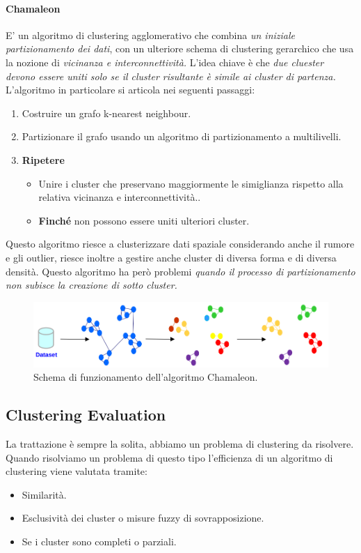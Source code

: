 \paragraph{Chamaleon} E' un algoritmo di clustering agglomerativo che combina \textit{un iniziale partizionamento dei dati}, con un ulteriore schema di clustering gerarchico che usa la nozione di \textit{vicinanza e interconnettività.} L'idea chiave è che \textit{due cluester devono essere uniti solo se il cluster risultante è simile ai cluster di partenza.}
L'algoritmo in particolare si articola nei seguenti passaggi:
\begin{enumerate}
	\item Costruire un grafo k-nearest neighbour.
	\item Partizionare il grafo usando un algoritmo di partizionamento a multilivelli.
	\item \textbf{Ripetere}
	\begin{itemize}
		\item Unire i cluster che preservano maggiormente le simiglianza rispetto alla relativa vicinanza e interconnettività..
		\item \textbf{Finché} non possono essere uniti ulteriori cluster.
	\end{itemize}
	
\end{enumerate}

Questo algoritmo riesce a clusterizzare dati spaziale considerando anche il rumore e gli outlier, riesce inoltre a gestire anche cluster di diversa forma e di diversa densità. Questo algoritmo ha però problemi \textit{quando il processo di partizionamento non subisce la creazione di sotto cluster.}
\begin{figure}[H]
	\centering
	\includegraphics[height=0.18 \linewidth]{clustering/pict/chamaleon.png}
	\caption{Schema di funzionamento dell'algoritmo Chamaleon.}
\end{figure}

\subsection{Clustering Evaluation}
La trattazione è sempre la solita, abbiamo un problema di clustering da risolvere. Quando risolviamo un problema di questo tipo l'efficienza di un algoritmo di clustering viene valutata tramite:
\begin{itemize}
	\item Similarità.
	\item Esclusività dei cluster o misure fuzzy di sovrapposizione.
	\item Se i cluster sono completi o parziali.
\end{itemize}

